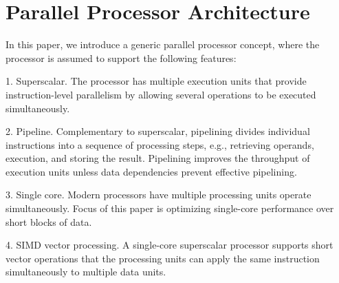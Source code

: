 \section{Parallel Processor Architecture}
\label{sec:processor}

In this paper, we introduce a generic parallel processor con\-cept,
where the processor is assumed to support the following features:

1. Superscalar. The processor has multiple execution units that provide instruction-level parallelism by allowing several
operations to be executed simultaneously.

2. Pipeline. Complementary to superscalar, pipelining divi\-des individual instructions into a sequence of processing steps,
e.g., retrieving operands, execution, and storing the result. 
Pipelining improves the throughput of execution units unless
data dependencies prevent effective pipelining.

3. Single core. Modern processors have multiple processing units operate simultaneously. Focus of this paper is optimizing single-core performance over short blocks of data.

4. SIMD vector processing. A single-core superscalar proce\-ssor supports short vector operations that the processing units can apply the
same instruction simultaneously to multiple data units.